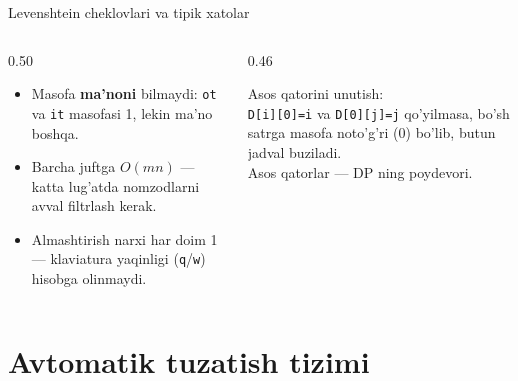 \documentclass[aspectratio=169,11pt]{beamer}
\begin{document}
\begin{frame}{Levenshtein cheklovlari va tipik xatolar}
  \begin{columns}[T]
    \begin{column}{0.50\textwidth}
      \begin{tcolorbox}[warnbox,title=Usulning cheklovlari]
        \small
        \begin{itemize}\setlength\itemsep{2pt}
          \item Masofa \textbf{ma'noni} bilmaydi:
                \texttt{ot} va \texttt{it} masofasi 1, lekin ma'no boshqa.
          \item Barcha juftga $O(mn)$ --- katta lug'atda nomzodlarni
                avval filtrlash kerak.
          \item Almashtirish narxi har doim 1 --- klaviatura yaqinligi
                (\texttt{q}/\texttt{w}) hisobga olinmaydi.
        \end{itemize}
      \end{tcolorbox}
    \end{column}
    \begin{column}{0.46\textwidth}
      \begin{tcolorbox}[warnbox,title=Tipik xato]
        \small
        Asos qatorini unutish:\\
        \footnotesize
        \texttt{D[i][0]=i} va \texttt{D[0][j]=j} qo'yilmasa, bo'sh
        satrga masofa noto'g'ri ($0$) bo'lib, butun jadval buziladi.\\[4pt]
        \normalsize Asos qatorlar --- DP ning poydevori.
      \end{tcolorbox}
    \end{column}
  \end{columns}
\end{frame}

\section[Arxitektura]{Avtomatik tuzatish tizimi}
\end{document}
